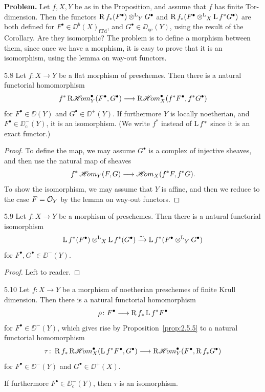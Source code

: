\textbf{Problem.}
Let $f,X,Y$ be as in the Proposition, and assume that $f$ has finite Tor-dimension. Then the functors $\operatorname{R} f_*(F^\bullet)\mathbin{\otimes^{\mathrm{L}}}_Y G^\bullet$ and $\operatorname{R} f_*(F^\bullet\mathbin{\otimes^{\mathrm{L}}}_X \operatorname{L} f^* G^\bullet)$ are both defined for $F^\bullet\in\DD^b(X)_{\mathrm{fTd}}$, and $G^\bullet\in\DD_{\mathrm{qc}}(Y)$, using the result of the Corollary. Are they isomorphic? The problem is to define a morphism between them, since once we have a morphism, it is easy to prove that it is an isomorphism, using the lemma on way-out functors.

\begin{bookproposition}{5.8}\label{prop:2.5.8}
Let $f\colon X\to Y$ be a flat morphism of preschemes. Then there is a natural functorial homomorphism
\[
f^* \mathop{\mathrm{R}\mathscr{H}\!om}\nolimits^\bullet_Y(F^\bullet,G^\bullet) \longrightarrow \mathop{\mathrm{R}\mathscr{H}\!om}\nolimits^\bullet_X(f^*F^\bullet,f^*G^\bullet)
\]
for $F^\bullet\in\DD(Y)$ and $G^\bullet\in\DD^+(Y)$. If furthermore $Y$ is locally noetherian, and $F^\bullet\in\DD_{\mathrm{c}}^-(Y)$, it is an isomorphism. (We write $f^*$ instead of $\operatorname{L} f^*$ since it is an exact functor.)
\end{bookproposition}

\begin{proof}
To define the map, we may assume $G^\bullet$ is a complex of injective sheaves, and then use the natural map of sheaves
\[
f^*\mathop{\mathscr{H}\!om}\nolimits_Y(F,G) \longrightarrow \mathop{\mathscr{H}\!om}\nolimits_X(f^*F,f^*G).
\]
To show the isomorphism, we may assume that $Y$ is affine, and then we reduce to the case $F=\mathcal{O}_Y$ by the lemma on way-out functors.
\end{proof}

\begin{bookproposition}{5.9}\label{prop:2.5.9}
Let $f\colon X\to Y$ be a morphism of preschemes. Then there is a natural functorial isomorphism
\[
\operatorname{L} f^*(F^\bullet) \mathbin{\otimes^{\mathrm{L}}}_X \operatorname{L} f^*(G^\bullet) \xrightarrow{\sim} \operatorname{L} f^*(F^\bullet\mathbin{\otimes^{\mathrm{L}}}_Y G^\bullet)
\]
for $F^\bullet,G^\bullet\in\DD^-(Y)$.
\end{bookproposition}

\begin{proof}
Left to reader.
\end{proof}

\begin{bookproposition}{5.10}\label{prop:2.5.10}
Let $f\colon X\to Y$ be a morphism of noetherian preschemes of finite Krull dimension. Then there is a natural functorial homomorphism
\[
\rho\colon F^\bullet \longrightarrow \operatorname{R} f_* \operatorname{L} f^*F^\bullet
\]
for $F^\bullet\in\DD^-(Y)$, which gives rise by Proposition~\ref{prop:2.5.5} to a natural functorial homomorphism
\[
\tau \colon \operatorname{R} f_* \mathop{\mathrm{R}\mathscr{H}\!om}\nolimits_X^\bullet(\operatorname{L} f^* F^\bullet, G^\bullet) \longrightarrow \mathop{\mathrm{R}\mathscr{H}\!om}\nolimits_Y^\bullet(F^\bullet, \operatorname{R} f_* G^\bullet)
\]
for $F^\bullet\in\DD^-(Y)$ and $G^\bullet\in\DD^+(X)$.

If furthermore $F^\bullet\in\DD_{\mathrm{c}}^-(Y)$, then $\tau$ is an isomorphism.
\end{bookproposition}

